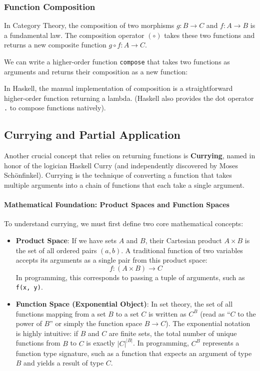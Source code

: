 \subsubsection{Function Composition}

In Category Theory, the composition of two morphisms $g: B \to C$ and $f: A \to B$ is a fundamental law. The composition operator $(\circ)$ takes these two functions and returns a new composite function $g \circ f: A \to C$.

We can write a higher-order function \texttt{compose} that takes two functions as arguments and returns their composition as a new function:



In Haskell, the manual implementation of composition is a straightforward higher-order function returning a lambda. (Haskell also provides the dot operator \texttt{.} to compose functions natively).



\subsection{Currying and Partial Application}

Another crucial concept that relies on returning functions is \textbf{Currying}, named in honor of the logician Haskell Curry (and independently discovered by Moses Schönfinkel). Currying is the technique of converting a function that takes multiple arguments into a chain of functions that each take a single argument.

\paragraph{Mathematical Foundation: Product Spaces and Function Spaces}

To understand currying, we must first define two core mathematical concepts:
\begin{itemize}
    \item \textbf{Product Space}: If we have sets $A$ and $B$, their Cartesian product $A \times B$ is the set of all ordered pairs $(a, b)$. A traditional function of two variables accepts its arguments as a single pair from this product space:
    \[ f : (A \times B) \to C \]
    In programming, this corresponds to passing a tuple of arguments, such as \texttt{f(x, y)}.
    \item \textbf{Function Space (Exponential Object)}: In set theory, the set of all functions mapping from a set $B$ to a set $C$ is written as $C^B$ (read as ``$C$ to the power of $B$'' or simply the function space $B \to C$). 
    The exponential notation is highly intuitive: if $B$ and $C$ are finite sets, the total number of unique functions from $B$ to $C$ is exactly $|C|^{|B|}$. In programming, $C^B$ represents a function type signature, such as a function that expects an argument of type $B$ and yields a result of type $C$.
\end{itemize}

